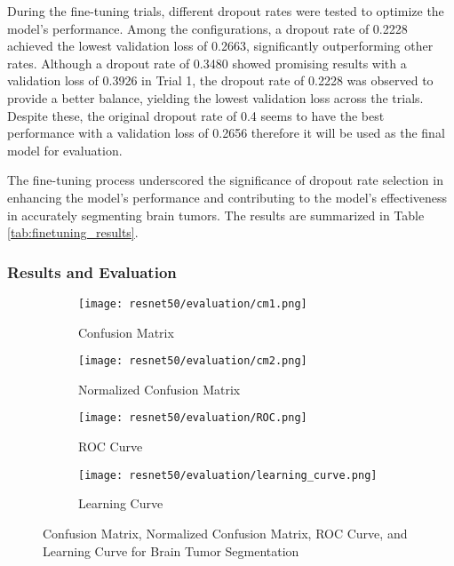 During the fine-tuning trials, different dropout rates were tested to optimize the model's performance. Among the configurations, a dropout rate of 0.2228 achieved the lowest validation loss of 0.2663, significantly outperforming other rates. Although a dropout rate of 0.3480 showed promising results with a validation loss of 0.3926 in Trial 1, the dropout rate of 0.2228 was observed to provide a better balance, yielding the lowest validation loss across the trials. Despite these, the original dropout rate of 0.4 seems to have the best performance with a validation loss of 0.2656 therefore it will be used as the final model for evaluation.

The fine-tuning process underscored the significance of dropout rate selection in enhancing the model's performance and contributing to the model's effectiveness in accurately segmenting brain tumors. The results are summarized in Table \ref{tab:finetuning_results}.

\subsubsection{Results and Evaluation}

\begin{figure}[H]
  \centering
  \begin{subfigure}[b]{0.2\textwidth}
    \centering
    \texttt{[image: resnet50/evaluation/cm1.png]}
    \caption{Confusion Matrix}
    \label{fig:resnet50_cm1}
  \end{subfigure}
  \hfill
  \begin{subfigure}[b]{0.2\textwidth}
    \centering
    \texttt{[image: resnet50/evaluation/cm2.png]}
    \caption{Normalized Confusion Matrix}
    \label{fig:resnet50_cm2}
  \end{subfigure}
  \hfill
  \begin{subfigure}[b]{0.25\textwidth}
    \centering
    \texttt{[image: resnet50/evaluation/ROC.png]}
    \caption{ROC Curve}
    \label{fig:resnet50_roc}
  \end{subfigure}
  \hfill
  \begin{subfigure}[b]{0.25\textwidth}
    \centering
    \texttt{[image: resnet50/evaluation/learning\_curve.png]}
    \caption{Learning Curve}
    \label{fig:resnet50_learning_curve}
  \end{subfigure}
  \caption{Confusion Matrix, Normalized Confusion Matrix, ROC Curve, and Learning Curve for Brain Tumor Segmentation}
  \label{fig:resnet50_evaluation}
\end{figure}

